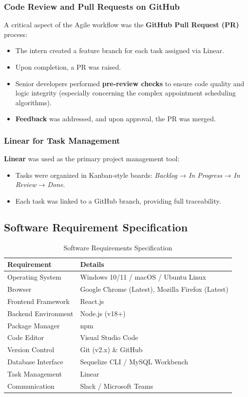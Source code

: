 \documentclass[12pt,a4paper]{article}
\begin{document}
\subsubsection{Code Review and Pull Requests on GitHub}
A critical aspect of the Agile workflow was the \textbf{GitHub Pull Request (PR)} process:
\begin{itemize}
    \item The intern created a feature branch for each task assigned via Linear.
    \item Upon completion, a PR was raised.
    \item Senior developers performed \textbf{pre-review checks} to ensure code quality and logic integrity (especially concerning the complex appointment scheduling algorithms).
    \item \textbf{Feedback} was addressed, and upon approval, the PR was merged.
\end{itemize}

\subsubsection{Linear for Task Management}
\textbf{Linear} was used as the primary project management tool:
\begin{itemize}
    \item Tasks were organized in Kanban-style boards: \textit{Backlog} → \textit{In Progress} → \textit{In Review} → \textit{Done}.
    \item Each task was linked to a GitHub branch, providing full traceability.
\end{itemize}

\subsection{Software Requirement Specification}

\begin{table}[H]
\centering
\caption{Software Requirements Specification}
\label{tab:srs}
\begin{tabular}{|p{4cm}|p{8cm}|}
\hline
\textbf{Requirement} & \textbf{Details} \\
\hline
Operating System & Windows 10/11 / macOS / Ubuntu Linux \\
\hline
Browser & Google Chrome (Latest), Mozilla Firefox (Latest) \\
\hline
Frontend Framework & React.js \\
\hline
Backend Environment & Node.js (v18+) \\
\hline
Package Manager & npm \\
\hline
Code Editor & Visual Studio Code \\
\hline
Version Control & Git (v2.x) \& GitHub \\
\hline
Database Interface & Sequelize CLI / MySQL Workbench \\
\hline
Task Management & Linear \\
\hline
Communication & Slack / Microsoft Teams \\
\hline
\end{tabular}
\end{table}
\end{document}
